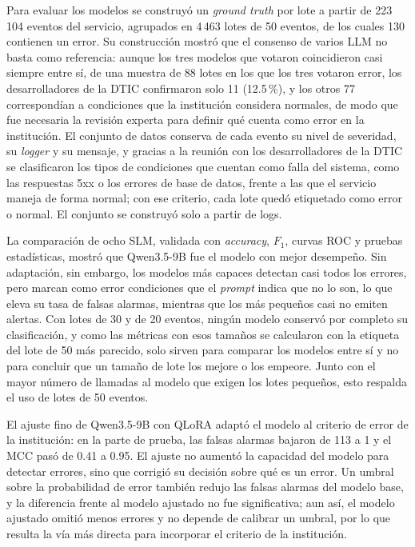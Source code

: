 Para evaluar los modelos se construyó un \textit{ground truth} por lote a partir de 223\,104 eventos del servicio, agrupados en 4\,463 lotes de 50 eventos, de los cuales 130 contienen un error. Su construcción mostró que el consenso de varios LLM no basta como referencia: aunque los tres modelos que votaron coincidieron casi siempre entre sí, de una muestra de 88 lotes en los que los tres votaron error, los desarrolladores de la DTIC confirmaron solo 11 (12.5\,\%), y los otros 77 correspondían a condiciones que la institución considera normales, de modo que fue necesaria la revisión experta para definir qué cuenta como error en la institución. El conjunto de datos conserva de cada evento su nivel de severidad, su \textit{logger} y su mensaje, y gracias a la reunión con los desarrolladores de la DTIC se clasificaron los tipos de condiciones que cuentan como falla del sistema, como las respuestas 5xx o los errores de base de datos, frente a las que el servicio maneja de forma normal; con ese criterio, cada lote quedó etiquetado como error o normal. El conjunto se construyó solo a partir de logs.

La comparación de ocho SLM, validada con \textit{accuracy}, $F_1$, curvas ROC y pruebas estadísticas, mostró que Qwen3.5-9B fue el modelo con mejor desempeño. Sin adaptación, sin embargo, los modelos más capaces detectan casi todos los errores, pero marcan como error condiciones que el \textit{prompt} indica que no lo son, lo que eleva su tasa de falsas alarmas, mientras que los más pequeños casi no emiten alertas. Con lotes de 30 y de 20 eventos, ningún modelo conservó por completo su clasificación, y como las métricas con esos tamaños se calcularon con la etiqueta del lote de 50 más parecido, solo sirven para comparar los modelos entre sí y no para concluir que un tamaño de lote los mejore o los empeore. Junto con el mayor número de llamadas al modelo que exigen los lotes pequeños, esto respalda el uso de lotes de 50 eventos.

El ajuste fino de Qwen3.5-9B con QLoRA adaptó el modelo al criterio de error de la institución: en la parte de prueba, las falsas alarmas bajaron de 113 a 1 y el MCC pasó de 0.41 a 0.95. El ajuste no aumentó la capacidad del modelo para detectar errores, sino que corrigió su decisión sobre qué es un error. Un umbral sobre la probabilidad de error también redujo las falsas alarmas del modelo base, y la diferencia frente al modelo ajustado no fue significativa; aun así, el modelo ajustado omitió menos errores y no depende de calibrar un umbral, por lo que resulta la vía más directa para incorporar el criterio de la institución.


